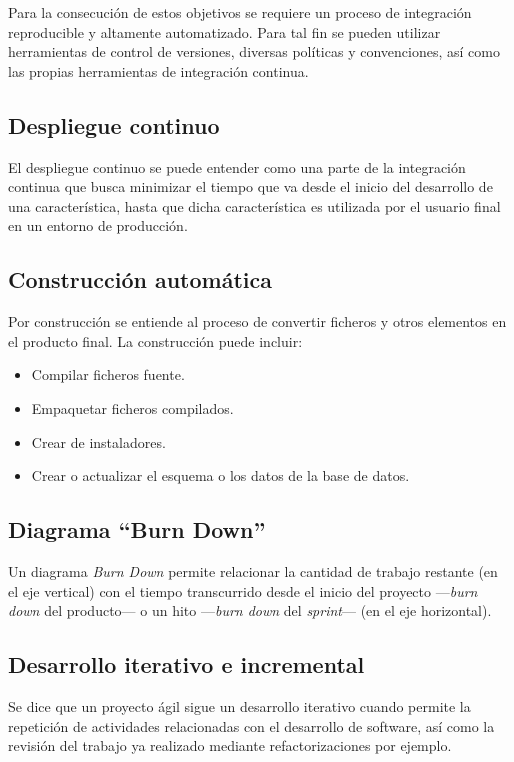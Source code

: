 Para la consecución de estos objetivos se requiere un proceso de integración reproducible y altamente automatizado. Para tal fin se pueden utilizar herramientas de control de versiones, diversas políticas y convenciones, así como las propias herramientas de integración continua.

\subsection{Despliegue continuo}

El despliegue continuo se puede entender como una parte de la integración continua que busca minimizar el tiempo que va desde el inicio del desarrollo de una característica, hasta que dicha característica es utilizada por el usuario final en un entorno de producción.

\subsection{Construcción automática}

Por construcción se entiende al proceso de convertir ficheros y otros elementos en el producto final. La construcción puede incluir:

\begin{itemize}
	\item Compilar ficheros fuente.
	\item Empaquetar ficheros compilados.
	\item Crear de instaladores.
	\item Crear o actualizar el esquema o los datos de la base de datos.
\end{itemize}

\subsection{Diagrama ``Burn Down''}

Un diagrama \emph{Burn Down} permite relacionar la cantidad de trabajo restante (en el eje vertical) con el tiempo transcurrido desde el inicio del proyecto —\emph{burn down} del producto— o un hito —\emph{burn down} del \emph{sprint}— (en el eje horizontal).

\subsection{Desarrollo iterativo e incremental}

Se dice que un proyecto ágil sigue un desarrollo iterativo cuando permite la repetición de actividades relacionadas con el desarrollo de software, así como la revisión del trabajo ya realizado mediante refactorizaciones por ejemplo.

